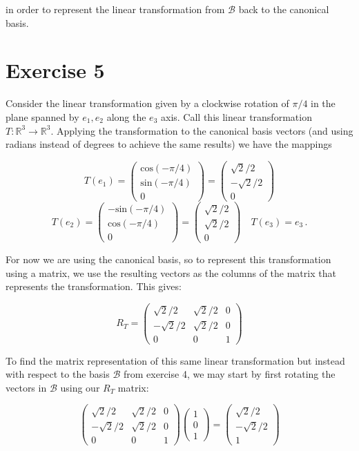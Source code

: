 \documentclass[11pt]{article}
\begin{document}
in order to represent the linear transformation from $\mathcal{B}$ back to the canonical basis. 

\section*{Exercise 5}

Consider the linear transformation given by a clockwise rotation of $\pi/4$ in the plane spanned by $e_1,e_2$ along the $e_3$ axis. Call this linear transformation $T: \mathbb{R}^3 \rightarrow \mathbb{R}^3$. Applying the transformation to the canonical basis vectors (and using radians instead of degrees to achieve the same results) we have the mappings 

$$T(e_1) = \begin{pmatrix}
\text{cos}(-\pi/4) \\ \text{sin}(-\pi/4) \\ 0
\end{pmatrix} = \begin{pmatrix}
\sqrt{2}/2 \\ -\sqrt{2}/2 \\ 0
\end{pmatrix} $$ $$T(e_2) = \begin{pmatrix}
-\text{sin}(-\pi/4) \\ \text{cos}(-\pi/4) \\ 0
\end{pmatrix} = \begin{pmatrix}
\sqrt{2}/2 \\ \sqrt{2}/2 \\ 0
\end{pmatrix} \quad T(e_3) = e_3 \,.$$

For now we are using the canonical basis, so to represent this transformation using a matrix, we use the resulting vectors as the columns of the matrix that represents the transformation. This gives:

$$R_T = \begin{pmatrix}
\sqrt{2}/2 &\sqrt{2}/2 &0 \\ -\sqrt{2}/2 & \sqrt{2}/2 & 0\\ 0&0&1
\end{pmatrix}$$


To find the matrix representation of this same linear transformation but instead with respect to the basis $\mathcal{B}$ from exercise 4, we may start by first rotating the vectors in $\mathcal{B}$ using our $R_T$ matrix:

$$\begin{pmatrix}
\sqrt{2}/2 &\sqrt{2}/2 &0 \\ -\sqrt{2}/2 & \sqrt{2}/2 & 0\\ 0&0&1
\end{pmatrix}\begin{pmatrix}
1\\0\\1
\end{pmatrix} = \begin{pmatrix}
\sqrt{2}/2 \\ -\sqrt{2}/2 \\ 1
\end{pmatrix}$$
\end{document}
